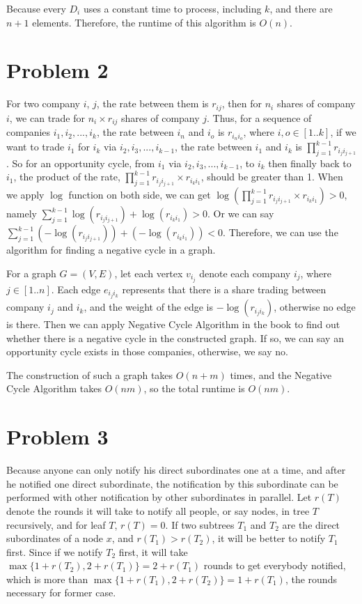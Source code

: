 \documentclass[letter,12pt]{article}
\begin{document}
 Because every $D_i$ uses a constant time to process, including $k$, and 
 there are $n+1$ elements. Therefore, the runtime of this algorithm is
 $O(n)$.

\section*{Problem 2}
For two company $i$, $j$, the rate between them is $r_{ij}$, then for $n_i$
shares of company $i$, we can trade for $n_i \times r_{ij}$ shares of 
company $j$. Thus, for a sequence of companies $i_1, i_2, ..., i_k$, the rate
between $i_n$ and $i_o$ is $r_{i_n i_o}$, where $i, o \in [1..k]$, if we want
to trade $i_1$ for $i_k$ via $i_2, i_3, ..., i_{k-1}$, the rate between $i_1$
and $i_k$ is $\prod\limits_{j=1}^{k-1} r_{i_j i_{j+1}}$. So for an opportunity
cycle, from $i_1$ via $i_2, i_3, ..., i_{k-1}$, to $i_k$ then finally back to 
$i_1$, the product of the rate, $\prod\limits_{j=1}^{k-1} r_{i_j i_{j+1}} 
\times r_{i_k i_1}$, should be greater than 1. When we apply $\log$ function
on both side, we can get $\log(\prod\limits_{j=1}^{k-1} r_{i_j i_{j+1}} 
\times r_{i_k i_1}) > 0$, namely $\sum\limits_{j=1}^{k-1} 
\log(r_{i_j i_{j+1}}) + \log(r_{i_k i_1}) > 0$. Or we can say 
$\sum\limits_{j=1}^{k-1} (-\log(r_{i_j i_{j+1}})) + (-\log(r_{i_k i_1})) < 0$.
Therefore, we can use the algorithm for finding a negative cycle in a graph.

For a graph $G=(V,E)$, let each vertex $v_{i_j}$ denote each company $i_j$,
where $j \in [1..n]$. Each edge $e_{i_j i_k}$ represents that there is a share 
trading between company $i_j$ and $i_k$, and the weight of the edge is 
$-\log(r_{i_j i_k})$, otherwise no edge is there. Then we can apply 
Negative Cycle Algorithm in the book to find out whether there is a negative
cycle in the constructed graph. If so, we can say an opportunity cycle exists
in those companies, otherwise, we say no.

The construction of such a graph takes $O(n+m)$ times, and the Negative
Cycle Algorithm takes $O(nm)$, so the total runtime is $O(nm)$.

\section*{Problem 3}
Because anyone can only notify his direct subordinates one at a time, and
after he notified one direct subordinate, the notification by this subordinate
can be performed with other notification by other subordinates in parallel.
Let $r(T)$ denote the rounds it will take to notify all people, or say nodes,
in tree $T$ recursively, and for leaf $T$, $r(T)=0$. If two subtrees $T_1$ and 
$T_2$ are the direct subordinates of a node $x$, and $r(T_1) > r(T_2)$, it 
will be better to notify $T_1$ first. Since if we notify $T_2$ first, it will take 
$\max\{1+r(T_2), 2+r(T_1)\}=2+r(T_1)$ rounds to get everybody notified, 
which is more than $\max\{1+r(T_1), 2+r(T_2)\}=1+r(T_1)$, the rounds
necessary for former case.
\end{document}
